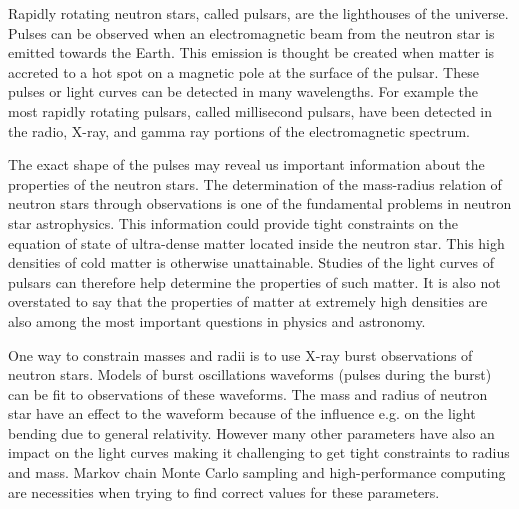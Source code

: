 \documentclass{wihuri}
\begin{document}
Rapidly rotating neutron stars, called pulsars, are the lighthouses of the universe. Pulses can be observed when an electromagnetic beam from the neutron star is emitted towards the Earth.  This emission is thought be created when matter is accreted to a hot spot on a magnetic pole at the surface of the pulsar. These pulses or light curves can be detected in many wavelengths. For example the most rapidly rotating pulsars, called millisecond pulsars, have been detected in the radio, X-ray, and gamma ray portions of the electromagnetic spectrum.

The exact shape of the pulses may reveal us important information about the properties of the neutron stars. The determination of the mass-radius relation of neutron stars through observations is one of the fundamental problems in neutron star astrophysics. This information could provide tight constraints on the equation of state of ultra-dense matter located inside the neutron star. This high densities of cold matter is otherwise unattainable. Studies of the light curves of pulsars can therefore help determine the properties of such matter. It is also not overstated to say that the properties of matter at extremely high densities are also among the most important questions in physics and astronomy. 


One way to constrain masses and radii is to use X-ray burst observations of neutron stars. Models of burst oscillations waveforms (pulses during the burst) can be fit to observations of these waveforms. The mass and radius of neutron star have an effect to the waveform because of the influence e.g. on the light bending due to general relativity. However many other parameters have also an impact on the light curves making it challenging to get tight constraints to radius and mass. Markov chain Monte Carlo sampling and high-performance computing are necessities when trying to find correct values for these parameters. 








\vspace{10cm}











\iffalse 
\end{document}
